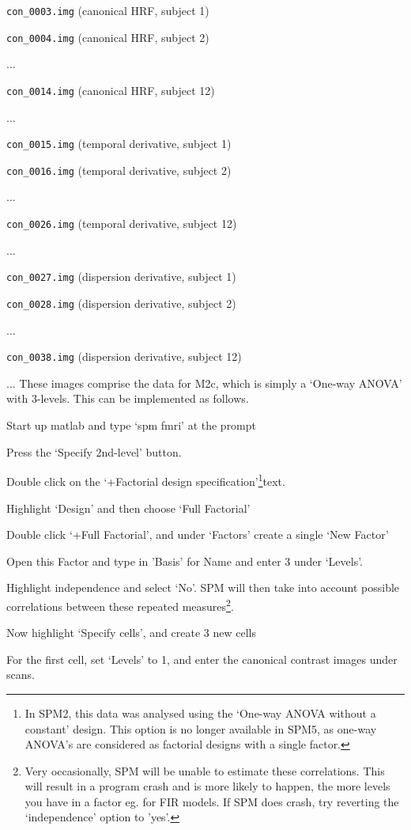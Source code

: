 \bi
\item{\verb!con_0003.img!		(canonical HRF, subject 1)}
\item{\verb!con_0004.img!		(canonical HRF, subject 2)}
\item{...}
\item{\verb!con_0014.img!		(canonical HRF, subject 12)}
\item{...}
\item{\verb!con_0015.img!		(temporal derivative, subject 1)}
\item{\verb!con_0016.img!		(temporal derivative, subject 2)}
\item{...}
\item{\verb!con_0026.img!		(temporal derivative, subject 12)}
\item{...}
\item{\verb!con_0027.img!		(dispersion derivative, subject 1)}
\item{\verb!con_0028.img!		(dispersion derivative, subject 2)}
\item{...}
\item{\verb!con_0038.img!		(dispersion derivative, subject 12)}
\item{...}
\ei
These images comprise the data for M2c, which is simply a `One-way ANOVA' with 3-levels. This can be implemented as follows.
\bi
\item{Start up matlab and type `spm fmri' at the prompt}
\item{Press the `Specify 2nd-level' button.}
\item{Double click on the `+Factorial design specification'\footnote{In SPM2, this data was analysed using the `One-way ANOVA without a constant' design. This option is no longer available in SPM5, as one-way ANOVA's are considered as factorial designs with a single factor.}text.}
\item{Highlight `Design' and then choose `Full Factorial'}
\item{Double click `+Full Factorial', and under `Factors' create a single `New Factor'}
\item{Open this Factor and type in 'Basis' for Name and enter 3 under `Levels'.}
\item{Highlight independence and select `No'. SPM will then take into account possible correlations between these repeated measures\footnote{Very occasionally, SPM will be unable to estimate these correlations. This will result in a program crash and is more likely to happen, the more levels you have in a factor eg. for FIR models. If SPM does crash, try reverting the `independence' option to 'yes'.}.}                                \item{Now highlight `Specify cells', and create 3 new cells}  \item{For the first cell, set `Levels' to 1, and enter the 
canonical contrast images under scans.}    
